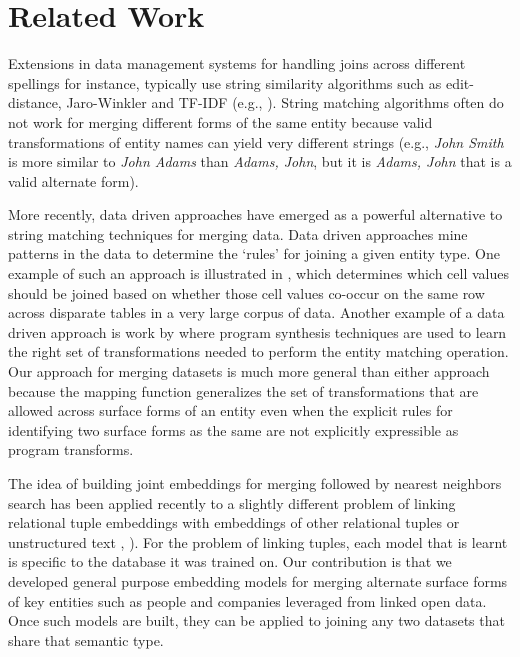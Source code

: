 \section{Related Work}
Extensions in data management systems for handling joins across different spellings for instance, typically use string similarity algorithms such as edit-distance, Jaro-Winkler and TF-IDF (e.g., \cite{Cohen2003}).  String matching algorithms often do not work for merging different forms of the same entity because valid transformations of entity names can yield very different strings (e.g., \textit{John Smith} is more similar to \textit{John Adams} than \textit{Adams, John}, but it is \textit{Adams, John} that is a valid alternate form).

More recently, data driven approaches have emerged as a powerful alternative to string matching techniques for merging data.  Data driven approaches mine patterns in the data to determine the `rules' for joining a given entity type.  One example of such an approach is illustrated in \cite{He:2015:SJS:2824032.2824036}, which determines which cell values should be joined based on whether those cell values co-occur on the same row across disparate tables in a very large corpus of data.  Another example of a data driven approach is work by \cite{auto-join-joining-tables-leveraging-transformations} where program synthesis techniques are used to learn the right set of transformations needed to perform the entity matching operation.  Our approach for merging datasets is much more general than either approach because the mapping function generalizes the set of transformations that are allowed across surface forms of an entity even when the explicit rules for identifying two surface forms as the same are not explicitly expressible as program transforms.

The idea of building joint embeddings for merging followed by nearest neighbors search has been applied recently to a slightly different problem of linking relational tuple embeddings with embeddings of other relational tuples or unstructured text \cite{Bordawekar18}, \cite{IDEL18}).  For the problem of linking tuples, each model that is learnt is specific to the database it was trained on.  Our contribution is that we developed general purpose embedding models for merging alternate surface forms of key entities such as people and companies leveraged from linked open data.  Once such models are built, they can be applied to joining any two datasets that share that semantic type.

